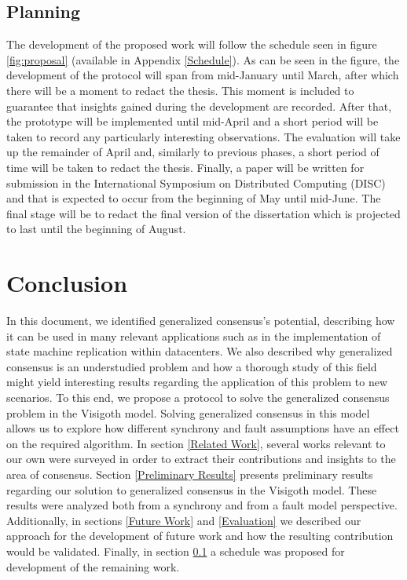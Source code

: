 \documentclass[runningheads,a4paper]{llncs}
\begin{document}
\subsection{Planning} \label{Planning}
The development of the proposed work will follow the schedule seen in figure \ref{fig:proposal} (available in Appendix \ref{Schedule}). As can be seen in the figure, the development of the protocol will span from mid-January until March, after which there will be a moment to redact the thesis. This moment is included to guarantee that insights gained during the development are recorded. After that, the prototype will be implemented until mid-April and a short period will be taken to record any particularly interesting observations. The evaluation will take up the remainder of April and, similarly to previous phases, a short period of time will be taken to redact the thesis. Finally, a paper will be written for submission in the International Symposium on Distributed Computing (DISC) and that is expected to occur from the beginning of May until mid-June. The final stage will be to redact the final version of the dissertation which is projected to last until the beginning of August.

\section{Conclusion}
In this document, we identified generalized consensus's potential, describing how it can be used in many relevant applications such as in the implementation of state machine replication within datacenters. We also described why generalized consensus is an understudied problem and how a thorough study of this field might yield interesting results regarding the application of this problem to new scenarios. To this end, we propose a protocol to solve the generalized consensus problem in the Visigoth model. Solving generalized consensus in this model allows us to explore how different synchrony and fault assumptions have an effect on the required algorithm. In section \ref{Related Work}, several works relevant to our own were surveyed in order to extract their contributions and insights to the area of consensus. Section \ref{Preliminary Results} presents preliminary results regarding our solution to generalized consensus in the Visigoth model. These results were analyzed both from a synchrony and from a fault model perspective. Additionally, in sections \ref{Future Work} and \ref{Evaluation} we described our approach for the development of future work and how the resulting contribution would be validated. Finally, in section \ref{Planning} a schedule was proposed for development of the remaining work.
\end{document}
